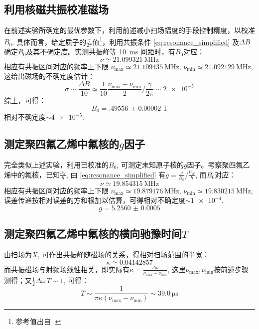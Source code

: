 \documentclass[aps,pre,12pt,preprint,%
	onecolumn,showpacs,showkeys,nofootinbib]{revtex4-1}
\begin{document}
\subsection{利用核磁共振校准磁场}
	在前述实验所确定的最优参数下，利用前述减小扫场幅度的手段控制精度，以校准$B_0$. 具体而言，给定质子的$\frac{\gamma}{2\pi}$值\footnote{%
		参考值出自 \cite{textbook}. 
	}，利用共振条件 \eqref{eq:resonance_simplified} 及$\Delta B$确定$B_0$及其不确定度。实测共振峰等 \SI{10}{\ms} 间距时，有$B_0$对应：
	\begin{equation}
		\nu \simeq \SI{21.099321}{\MHz}
	\end{equation}
	相应有共振区间对应的频率上下限
		$\nu_{\max} \simeq \SI{21.109435}{\MHz},\,
		\nu_{\min} \simeq \SI{21.092129}{\MHz}$, 
	这给出磁场的不确定度估计：
	\begin{equation}
		\sigma \sim \frac{\Delta B}{10}
			\simeq \frac{1}{10} \frac{\nu_{\max} - \nu_{\min}}{2}
			\bigg/ \frac{\gamma}{2\pi}
			\sim \num{2e-5}
	\end{equation}
\clearpage
	综上，可得：
	\begin{equation}
		B_0 = \SI{.49556(2)}{\tesla}
	\end{equation}
	相对不确定度$\sim\num{4e-5}$. 
\subsection{测定聚四氟乙烯中氟核的$g$因子}
	完全类似上述实验，利用已校准的$B_0$, 可测定未知原子核的$g$因子。考察聚四氟乙烯中的氟核，已知$\frac{\nu_N}{\hbar}$, 由 \eqref{eq:resonance_simplified} 有$g = \frac{\nu}{B_0}\big/\frac{\mu_N}{\hbar}$, 而$B_0$对应：
	\begin{equation}
		\nu \simeq \SI{19.854315}{\MHz}
	\end{equation}
	相应有共振区间对应的频率上下限
		$\nu_{\max} \simeq \SI{19.879176}{\MHz},\,
		\nu_{\min} \simeq \SI{19.830215}{\MHz}$, 
	误差传递按相对误差的方和根加以估算，可得相对不确定度$\sim\num{1e-4}$, 
	\begin{equation}
		g = \num{5.2560(5)}
	\end{equation}
\subsection{测定聚四氟乙烯中氟核的横向驰豫时间$T$}
	由扫场为$X$, 可作出共振峰随磁场的关系，得相对扫场范围的半宽：
	\begin{equation}
		\kappa \simeq \num{0.04142857}
	\end{equation}
	而共振磁场与射频场线性相关，即实际有$\kappa = \frac{\Delta\nu}{\nu_{\max} - \nu_{\min}}$, 这里$\nu_{\max}, \nu_{\min}$按前述步骤测得；又$\frac{1}{2}\Delta\omega\,T\sim 1$, 可得：
	\begin{equation}
		T \sim \frac{1}{\pi\kappa(\nu_{\max} - \nu_{\min})}
		\sim \SI{39.0}{\us}
	\end{equation}
\end{document}
